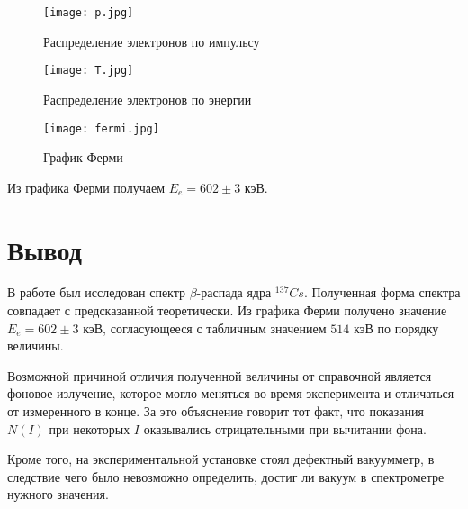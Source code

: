 \documentclass{physlab}
\begin{document}
\begin{figure}[H]
\centering
\texttt{[image: p.jpg]}
\caption{Распределение электронов по импульсу}
\end{figure}

\begin{figure}[H] 
\centering
    \texttt{[image: T.jpg]}
\caption{Распределение электронов по энергии}
\end{figure}

\begin{figure}[H] \label{fermi}
\centering
    \texttt{[image: fermi.jpg]}
\caption{График Ферми}
\end{figure}

Из графика Ферми получаем $E_e = 602 \pm 3 \text{ кэВ}$.

\section{Вывод}

В работе был исследован спектр $\beta$-распада ядра ${}^{137}Cs$. Полученная форма спектра совпадает с предсказанной теоретически. Из графика Ферми получено значение $E_e = 602 \pm 3 \text{ кэВ}$, согласующееся с табличным значением $514 \text{ кэВ}$ по порядку величины. 

Возможной причиной отличия полученной величины от справочной является фоновое излучение, которое могло меняться во время эксперимента и отличаться от измеренного в конце. За это объяснение говорит тот факт, что показания $N(I)$ при некоторых $I$ оказывались отрицательными при вычитании фона. 

Кроме того, на экспериментальной установке стоял дефектный вакуумметр, в следствие чего было невозможно определить, достиг ли вакуум в спектрометре нужного значения.
\end{document}
